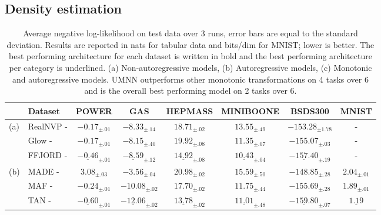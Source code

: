 \documentclass{article}
\newcommand{\mb}{\boldsymbol}
\newcommand{\tbf}[1]{\textbf{#1}}
\begin{document}
\subsection{Density estimation}

\begin{table}
    \caption{Average negative log-likelihood on test data over 3 runs, error bars are equal to the standard deviation.
    Results are reported in nats for tabular data and bits/dim for MNIST; lower is better.
    The best performing architecture for each dataset is written in bold and the best performing architecture per category is underlined.
    (a) Non-autoregressive models, (b) Autoregressive models, (c) Monotonic and autoregressive models.
    UMNN outperforms other monotonic transformations on 4 tasks over 6 and is the overall best performing model on 2 tasks over 6.
    }\label{tab:tabular_density}
    \centering
    \scriptsize
    \setlength{\tabcolsep}{1pt}
    \renewcommand{\arraystretch}{1.5}

    \begin{tabular}{l l c c c c c c }
        \hline
        &Dataset & \tbf{POWER} & \tbf{GAS} & \tbf{HEPMASS} & \tbf{MINIBOONE} & \tbf{BSDS300} & \tbf{MNIST} \\
        \hline

        \multirow{3}{*}{(a)} &
        RealNVP - \cite{RealNVP} & $-0.17_{\pm.01}$ & $-8.33_{\pm.14}$ & $18.71_{\pm.02}$ & $13.55_{\pm.49}$ & $-153.28_{\pm1.78}$ & - \\
        & Glow - \cite{GLOW}& $-0.17_{\pm.01}$ & $-8.15_{\pm.40}$ & $19.92_{\pm.08}$ & $11.35_{\pm.07}$ & $-155.07_{\pm.03}$ & - \\
        & FFJORD - \cite{ffjord}& $\underline{-0.46}_{\pm.01}$ & $\underline{-8.59}_{\pm.12}$ & $\underline{14.92}_{\pm.08}$ & $\underline{10.43}_{\pm.04}$ & $\underline{-157.40}_{\pm.19}$ & - \\ \hline

        \multirow{3}{*}{(b)}
        & MADE - \cite{MADE}& $3.08_{\pm.03}$ & $-3.56_{\pm.04}$ & $20.98_{\pm.02}$ & $15.59_{\pm.50}$ & $-148.85_{\pm.28}$ & $2.04_{\pm.01}$\\
        & MAF - \cite{MAF} & $-0.24_{\pm.01}$ & $-10.08_{\pm.02}$ & $17.70_{\pm.02}$ & $11.75_{\pm.44}$ & $-155.69_{\pm.28}$ & $1.89_{\pm.01}$\\
        & TAN - \cite{TAN}& $\underline{-0.60}_{\pm.01}$ & $\mb{\underline{-12.06}}_{\pm.02}$ & $\mb{\underline{13.78}}_{\pm.02}$ & $\underline{11.01}_{\pm.48}$ & $\mb{\underline{-159.80}}_{\pm.07}$ & $\underline{1.19}$\\\hline


\end{tabular}
\end{table}
\end{document}
